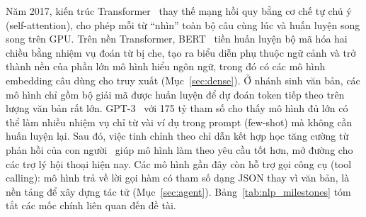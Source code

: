 Năm 2017, kiến trúc Transformer~\cite{vaswani2017attention} thay thế mạng hồi quy bằng cơ chế tự chú ý (self-attention), cho phép mỗi từ ``nhìn'' toàn bộ câu cùng lúc và huấn luyện song song trên GPU. Trên nền Transformer, BERT~\cite{devlin2019bert} tiền huấn luyện bộ mã hóa hai chiều bằng nhiệm vụ đoán từ bị che, tạo ra biểu diễn phụ thuộc ngữ cảnh và trở thành nền của phần lớn mô hình hiểu ngôn ngữ, trong đó có các mô hình embedding câu dùng cho truy xuất (Mục~\ref{sec:dense}). Ở nhánh sinh văn bản, các mô hình chỉ gồm bộ giải mã được huấn luyện để dự đoán token tiếp theo trên lượng văn bản rất lớn. GPT-3~\cite{brown2020gpt3} với 175 tỷ tham số cho thấy mô hình đủ lớn có thể làm nhiều nhiệm vụ chỉ từ vài ví dụ trong prompt (few-shot) mà không cần huấn luyện lại. Sau đó, việc tinh chỉnh theo chỉ dẫn kết hợp học tăng cường từ phản hồi của con người~\cite{ouyang2022instructgpt} giúp mô hình làm theo yêu cầu tốt hơn, mở đường cho các trợ lý hội thoại hiện nay. Các mô hình gần đây còn hỗ trợ gọi công cụ (tool calling): mô hình trả về lời gọi hàm có tham số dạng JSON thay vì văn bản, là nền tảng để xây dựng tác tử (Mục~\ref{sec:agent}). Bảng~\ref{tab:nlp_milestones} tóm tắt các mốc chính liên quan đến đề tài.


